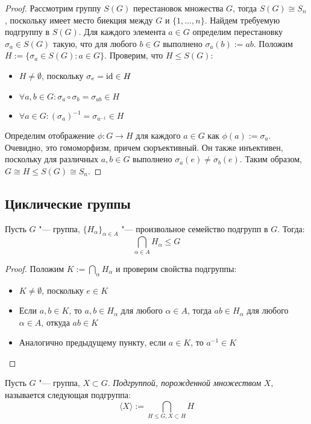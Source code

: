 \begin{proof}
	Рассмотрим группу $S(G)$ перестановок множества $G$, тогда $S(G) \cong S_n$, поскольку имеет место биекция между $G$ и $\{1, \dots, n\}$. Найдем требуемую подгруппу в $S(G)$. Для каждого элемента $a \in G$ определим перестановку $\sigma_a \in S(G)$ такую, что для любого $b \in G$ выполнено $\sigma_a(b) := ab$. Положим $H := \{\sigma_a \in S(G): a \in G\}$. Проверим, что $H \le S(G)$:
	\begin{itemize}
		\item $H \ne \emptyset$, поскольку $\sigma_e = \mathrm{id} \in H$
		\item $\forall a, b \in G: \sigma_a \circ \sigma_b = \sigma_{ab} \in H$
		\item $\forall a \in G: (\sigma_a)^{-1} = \sigma_{a^{-1}} \in H$
	\end{itemize}
	
	Определим отображение $\phi: G \rightarrow H$ для каждого $a \in G$ как $\phi(a) := \sigma_a$. Очевидно, это гомоморфизм, причем сюръективный. Он также инъективен, поскольку для различных $a, b \in G$ выполнено $\sigma_a(e) \ne \sigma_b(e)$. Таким образом, $G \cong H \le S(G) \cong S_n$.
\end{proof}

\subsection{Циклические группы}

\begin{proposition}
	Пусть $G$ "--- группа, $\{H_\alpha\}_{\alpha \in A}$ "--- произвольное семейство подгрупп в $G$. Тогда:
	\[\bigcap_{\alpha \in A} H_\alpha \le G\]
\end{proposition}

\begin{proof}
	Положим $K := \bigcap_{\alpha} H_\alpha$ и проверим свойства подгруппы:
	\begin{itemize}
		\item $K \ne \emptyset$, поскольку $e \in K$
		\item Если $a, b \in K$, то $a, b \in H_\alpha$ для любого $\alpha \in A$, тогда $ab \in H_\alpha$ для любого $\alpha \in A$, откуда $ab \in K$
		\item Аналогично предыдущему пункту, если $a\in K$, то $a^{-1}\in K$\qedhere
	\end{itemize}
\end{proof}

\begin{definition}
	Пусть $G$ "--- группа, $X \subset G$. \textit{Подгруппой, порожденной множеством} $X$, называется следующая подгруппа:
	\[\langle X\rangle := \bigcap_{H \le G, X \subset H}H\]
\end{definition}

